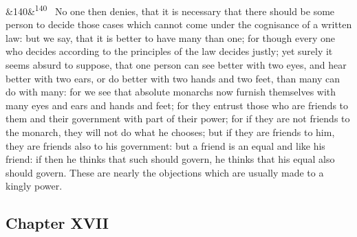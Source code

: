 \documentclass[12pt]{article}
\newcommand{\para}[1][]{\par\noindent\ifx&#1&\else\textsuperscript{\footnotesize #1}~\fi}
\begin{document}
\para[140] No one then denies, that it is necessary that there should be some person to decide those cases which cannot come under the cognisance of a written law: but we say, that it is better to have many than one; for though every one who decides according to the principles of the law decides justly; yet surely it seems absurd to suppose, that one person can see better with two eyes, and hear better with two ears, or do better with two hands and two feet, than many can do with many: for we see that absolute monarchs now furnish themselves with many eyes and ears and hands and feet; for they entrust those who are friends to them and their government with part of their power; for if they are not friends to the monarch, they will not do what he chooses; but if they are friends to him, they are friends also to his government: but a friend is an equal and like his friend: if then he thinks that such should govern, he thinks that his equal also should govern. These are nearly the objections which are usually made to a kingly power.

\subsection*{Chapter XVII}
\end{document}
